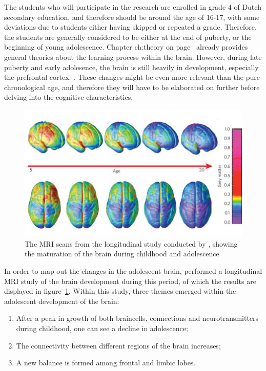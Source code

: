 The students who will participate in the research are enrolled in grade 4 of Dutch secondary education, and therefore should be around the age of 16-17, with some deviations due to students either having skipped or repeated a grade. Therefore, the students are generally considered to be either at the end of puberty, or the beginning of young adolescence. Chapter \refname{ch:theory} on page~\pageref{ch:theory} already provides general theories about the learning process within the brain. However, during late puberty and early adolesence, the brain is still heavily in development, especially the prefrontal cortex. \cite{blakemore}. These changes might be even more relevant than the pure chronological age, and therefore they will have to be elaborated on further before delving into the cognitive characteristics.

\begin{figure}
    \centering
    \includegraphics[width=.7\textwidth]{img/braindevelopment.png}
    \caption{The MRI scans from the longitudinal study conducted by \protect{}, showing the maturation of the brain during childhood and adolescence}
    \label{fig:braindevelopment}
\end{figure}

In order to map out the changes in the adolescent brain,  performed a longitudinal MRI study of the brain development during this period, of which the results are displayed in figure~\ref{fig:braindevelopment}. Within this study, three themes emerged within the adolescent development of the brain:

\begin{enumerate}
    \item After a peak in growth of both braincells, connections and neurotransmitters during childhood, one can see a decline in adolescence;
    \item The connectivity between different regions of the brain increases;
    \item A new balance is formed among frontal and limbic lobes.
\end{enumerate}

